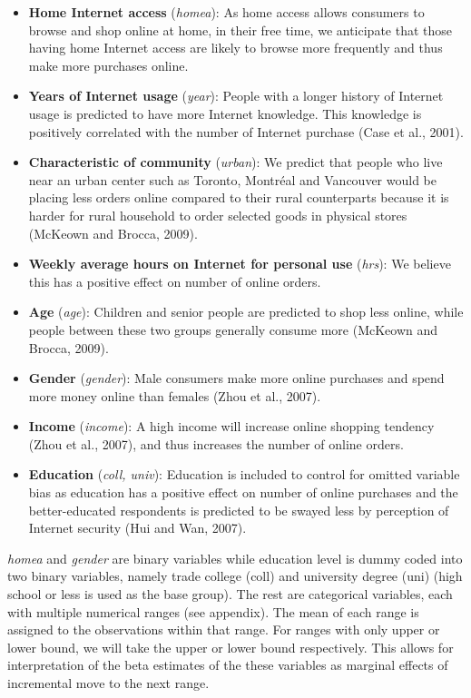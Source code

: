 \documentclass[11pt,twoside]{article}
\begin{document}
\begin{itemize}
    \item \textbf{Home Internet access} (\textit{homea}): As home access allows consumers to browse and shop online at home, in their free time, we anticipate that those having home Internet access are likely to browse more frequently and thus make more purchases online.
    \item \textbf{Years of Internet usage} (\textit{year}): People with a longer history of Internet usage is predicted to have more Internet knowledge. This knowledge is positively correlated with the number of Internet purchase (Case et al., 2001).
    \item \textbf{Characteristic of community} (\textit{urban}): We predict that people who live near an urban center such as Toronto, Montréal and Vancouver would be placing less orders online compared to their rural counterparts because it is harder for rural household to order selected goods in physical stores (McKeown and Brocca, 2009).
    \item \textbf{Weekly average hours on Internet for personal use} (\textit{hrs}): We believe this has a positive effect on number of online orders.
    \item \textbf{Age} (\textit{age}): Children and senior people are predicted to shop less online, while people between these two groups generally consume more (McKeown and Brocca, 2009).
    \item \textbf{Gender} (\textit{gender}): Male consumers make more online purchases and spend more money online than females (Zhou et al., 2007).
    \item \textbf{Income} (\textit{income}): A high income will increase online shopping tendency (Zhou et al., 2007), and thus increases the number of online orders.
    \item \textbf{Education} (\textit{coll, univ}): Education is included to control for omitted variable bias as education has a positive effect on number of online purchases and the better-educated respondents is predicted to be swayed less by perception of Internet security (Hui and Wan, 2007).
\end{itemize}

\textit{homea} and \textit{gender} are binary variables while education level is dummy coded into two binary variables, namely trade college (coll) and university degree (uni) (high school or less is used as the base group). The rest are categorical variables, each with multiple numerical ranges (see appendix). The mean of each range is assigned to the observations within that range. For ranges with only upper or lower bound, we will take the upper or lower bound respectively. This allows for interpretation of the beta estimates of the these variables as marginal effects of incremental move to the next range.
\end{document}
